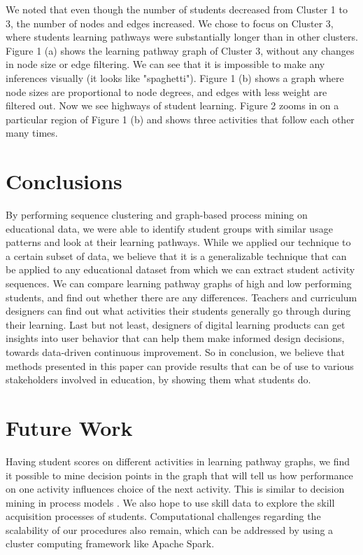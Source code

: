 \documentclass{edm_template}
\begin{document}
We noted that even though the number of students decreased from Cluster 1 to 3, the number of nodes and edges increased. We chose to focus on Cluster 3, where students learning pathways were substantially longer than in other clusters. Figure 1 (a) shows the learning pathway graph of Cluster 3, without any changes in node size or edge filtering. We can see that it is impossible to make any inferences visually (it looks like "spaghetti"). Figure 1 (b) shows a graph where node sizes are proportional to node degrees, and edges with less weight are filtered out. Now we see highways of student learning. Figure 2 zooms in on a particular region of Figure 1 (b) and shows three activities that follow each other many times.

\section{Conclusions}
By performing sequence clustering and graph-based process mining on educational data, we were able to identify student groups with similar usage patterns and look at their learning pathways. While we applied our technique to a certain subset of data, we believe that it is a generalizable technique that can be applied to any educational dataset from which we can extract student activity sequences. We can compare learning pathway graphs of high and low performing students, and find out whether there are any differences. Teachers and curriculum designers can find out what activities their students generally go through during their learning. Last but not least, designers of digital learning products can get insights into user behavior that can help them make informed design decisions, towards data-driven continuous improvement. So in conclusion, we believe that methods presented in this paper can provide results that can be of use to various stakeholders involved in education, by showing them what students do.

\section{Future Work}
Having student scores on different activities in learning pathway graphs, we find it possible to mine decision points in the graph that will tell us how performance on one activity influences choice of the next activity. This is similar to decision mining in process models \cite{van2016process}. We also hope to use skill data to explore the skill acquisition processes of students. Computational challenges regarding the scalability of our procedures also remain, which can be addressed by using a cluster computing framework like Apache Spark.



\end{document}
